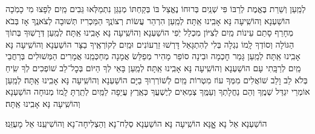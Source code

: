 \documentclass[twoside, openany, parskip=half, 11pt]{book}
\begin{document}
\begin{small}
לְמַֽעַן וְשֵׁרֵת בֶּאֱמֶת לְרַבּוֹ פִּי שְׁנַֽיִם בְּרוּחוֹ נֶאֱצַל בּוֹ
בְּקַחְתּוֹ מְנַגֵּן נִתְמַלְּאוּ גֵּבִים מַֽיִם לְפָצוּ מִי כָמֹֽכָה הוֹשַׁעְנָא וְהוֹשִֽׁיעָה נָּא אָבִֽינוּ אַֽתָּה׃
לְמַֽעַן הִרְהֵר עֲשׂוֹת רְצוֹנֶֽךָ הַמַּכְרִיז תְּשׁוּבָה לְצֹאנֶֽךָ
אָז בְּבֹא מְחָרֵף סָתַם עֵינוֹת מַֽיִם לְצִיּוֹן מִכְלַל יֹֽפִי הוֹשַׁעְנָא וְהוֹשִֽׁיעָה נָּא אָבִֽינוּ אַֽתָּה׃
לְמַֽעַן דְּרָשֽׁוּךָ בְּתוֹךְ הַגּוֹלָה וְסוֹדְךָ לָֽמוֹ נִגְלָה
בְּלִי לְהִתְגָּאֵל דָּרְשׁוּ זֵרְעוֹנִים וּמַֽיִם לְקוֹרְאֶֽיךָ בַצָּר הוֹשַׁעְנָא וְהוֹשִֽׁיעָה נָּא אָבִֽינוּ אַֽתָּה׃
לְמַֽעַן גָּמַר חׇכְמָה וּבִינָה סוֹפֵר מָהִיר מְפַלֵּשׂ אֲמָנָה
מְחַכְּמֵֽנוּ אֲמָרִים הַמְּשׁוּלִים בְּרַחֲבֵי מַֽיִם לְרַבָּֽתִי עָם הוֹשַׁעְנָא וְהוֹשִֽׁיעָה נָּא אָבִֽינוּ אַֽתָּה׃
לְמַֽעַן בָּאֵי לְךָ הַיּוֹם בְּכׇל־לֵב שׁוֹפְכִים לְךָ שִֽׂיחַ בְּלֹא לֵב וָלֵב
שׁוֹאֲלִים מִמְּךָ עוֹז מִטְרוֹת מַֽיִם לְשׁוֹרְרֽוּךָ בַיָּם הוֹשַׁעְנָא וְהוֹשִֽׁיעָה נָּא אָבִֽינוּ אַֽתָּה׃
לְמַֽעַן אוֹמְרֵי יִגְדַּל שְׁמֶֽךָ וְהֵם נַחֲלָתְךָ וְעַמֶּֽךָ
צְמֵאִים לְיֶשְׁעֲךָ כְּאֶֽרֶץ עֲיֵפָה לַמַּֽיִם לְתַֽרְתָּ לָֽמוֹ מְנוּחָה הוֹשַׁעְנָא וְהוֹשִֽׁיעָה נָּא אָבִֽינוּ אַֽתָּה׃

\end{small}

\begin{large}
\shatzvkahal
הוֹשַׁעְנָא אֵל נָא אׇׇׇנָּא הוֹשִֽׁיעָה נָּא׃
הוֹשַׁעְנָא סְלַח־נָא וְהַצְלִיחָה־נָא וְהוֹשִׁיעֵֽנוּ אֵל מָעֻזֵּֽנוּ׃

\end{large}
\end{document}
